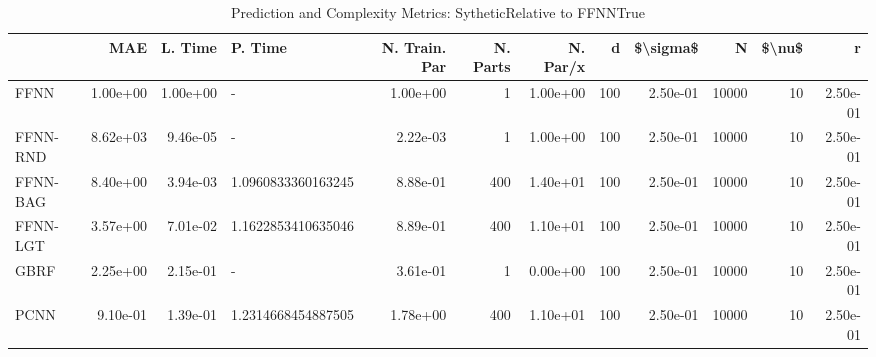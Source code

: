 \begin{table}
\centering
\caption{Prediction and Complexity Metrics: SytheticRelative to FFNNTrue}
\label{tab__Sythetic__Fix_Neurons_QTrue}
\begin{tabular}{lrrlrrrrrrrr}
\toprule
{} &      MAE &  L. Time &             P. Time &  N. Train. Par &  N. Parts &  N. Par/x &    d &  \$\textbackslash sigma\$ &      N &  \$\textbackslash nu\$ &        r \\
\midrule
FFNN     & 1.00e+00 & 1.00e+00 &                   - &       1.00e+00 &         1 &  1.00e+00 &  100 &  2.50e-01 &  10000 &     10 & 2.50e-01 \\
FFNN-RND & 8.62e+03 & 9.46e-05 &                   - &       2.22e-03 &         1 &  1.00e+00 &  100 &  2.50e-01 &  10000 &     10 & 2.50e-01 \\
FFNN-BAG & 8.40e+00 & 3.94e-03 &  1.0960833360163245 &       8.88e-01 &       400 &  1.40e+01 &  100 &  2.50e-01 &  10000 &     10 & 2.50e-01 \\
FFNN-LGT & 3.57e+00 & 7.01e-02 &  1.1622853410635046 &       8.89e-01 &       400 &  1.10e+01 &  100 &  2.50e-01 &  10000 &     10 & 2.50e-01 \\
GBRF     & 2.25e+00 & 2.15e-01 &                   - &       3.61e-01 &         1 &  0.00e+00 &  100 &  2.50e-01 &  10000 &     10 & 2.50e-01 \\
PCNN     & 9.10e-01 & 1.39e-01 &  1.2314668454887505 &       1.78e+00 &       400 &  1.10e+01 &  100 &  2.50e-01 &  10000 &     10 & 2.50e-01 \\
\bottomrule
\end{tabular}
\end{table}
